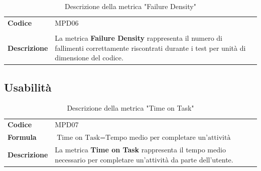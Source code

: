 \documentclass[a4paper,12pt]{article}
\begin{document}
        {\renewcommand{\arraystretch}{1.4}
            \begin{table}[H]
            \centering
            \begin{tabularx}{\textwidth}{|l|X|}
                \hline
                \rowcolor{gold}
                \multicolumn{2}{|c|}{\textbf{Failure Density}}\\
                \hline
                \textbf{Codice} & MPD06 \\
                \hline
                \raisebox{0.6\height}{\textbf{Formula}} &  \rule{0pt}{5ex}\raisebox{0.3\height}{\( \displaystyle \text{Failure Density} = \frac{\text{Numero di fallimenti totali}}{\text{Dimensione dell'Unità di codice}} \)}\\
                \hline
                \textbf{Descrizione} & La metrica \textbf{Failure Density} rappresenta il numero di fallimenti correttamente riscontrati durante i test per unità di dimensione del codice.\\
                \hline
            \end{tabularx}      
            \caption{Descrizione della metrica "Failure Density"}
            \end{table}
        }

        \subsection{Usabilità}

        {\renewcommand{\arraystretch}{1.4}
            \begin{table}[H]
            \centering
            \begin{tabularx}{\textwidth}{|l|X|}
                \hline
                \rowcolor{gold}
                \multicolumn{2}{|c|}{\textbf{Time on Task}}\\
                \hline
                \textbf{Codice} & MPD07 \\
                \hline
                \textbf{Formula} & \( \displaystyle \text{Time on Task} = \text{Tempo medio per completare un'attività} \)\\
                \hline
                \textbf{Descrizione} & La metrica \textbf{Time on Task} rappresenta il tempo medio necessario per completare un'attività da parte dell'utente. \\
                \hline
            \end{tabularx}      
            \caption{Descrizione della metrica "Time on Task"}
            \end{table}
        }
\end{document}

